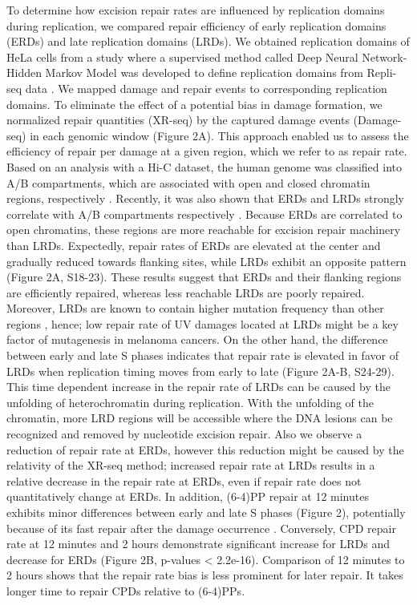 To determine how excision repair rates are influenced by replication domains during replication, we compared repair efficiency of early replication domains (ERDs) and late replication domains (LRDs). We obtained replication domains of HeLa cells from a study where a supervised method called Deep Neural Network-Hidden Markov Model was developed to define replication domains from Repli-seq data \citep{liu2016novo}. We mapped damage and repair events to corresponding replication domains. To eliminate the effect of a potential bias in damage formation, we normalized repair quantities (XR-seq) by the captured damage events (Damage-seq) in each genomic window (Figure 2A). This approach enabled us to assess the efficiency of repair per damage at a given region, which we refer to as repair rate. Based on an analysis with a Hi-C dataset, the human genome was classified into A/B compartments, which are associated with open and closed chromatin regions, respectively \citep{lieberman2009comprehensive}. Recently, it was also shown that ERDs and LRDs strongly correlate with A/B compartments respectively \citep{pope2014topologically,ryba2010evolutionarily}. Because ERDs are correlated to open chromatins, these regions are more reachable for excision repair machinery than LRDs. Expectedly, repair rates of ERDs are elevated at the center and gradually reduced towards flanking sites, while LRDs exhibit an opposite pattern (Figure 2A, S18-23). These results suggest that ERDs and their flanking regions are efficiently repaired, whereas less reachable LRDs are poorly repaired. Moreover, LRDs are known to contain higher mutation frequency than other regions \citep{lawrence2013mutational,stamatoyannopoulos2009human}, hence; low repair rate of UV damages located at LRDs might be a key factor of mutagenesis in melanoma cancers. 
On the other hand, the difference between early and late S phases indicates that repair rate is elevated in favor of LRDs when replication timing moves from early to late (Figure 2A-B, S24-29). This time dependent increase in the repair rate of LRDs can be caused by the unfolding of heterochromatin during replication. With the unfolding of the chromatin, more LRD regions will be accessible where the DNA lesions can be recognized and removed by nucleotide excision repair. Also we observe a reduction of repair rate at ERDs, however this reduction might be caused by the relativity of the XR-seq method; increased repair rate at LRDs results in a relative decrease in the repair rate at ERDs, even if repair rate does not quantitatively change at ERDs. In addition, (6-4)PP repair at 12 minutes exhibits minor differences between early and late S phases (Figure 2), potentially because of its fast repair after the damage occurrence \citep{hu2017dynamic}. Conversely, CPD repair rate at 12 minutes and 2 hours demonstrate significant increase for LRDs and decrease for ERDs (Figure 2B, p-values < 2.2e-16). Comparison of 12 minutes to 2 hours shows that the repair rate bias is less prominent for later repair. It takes longer time to repair CPDs relative to (6-4)PPs.

